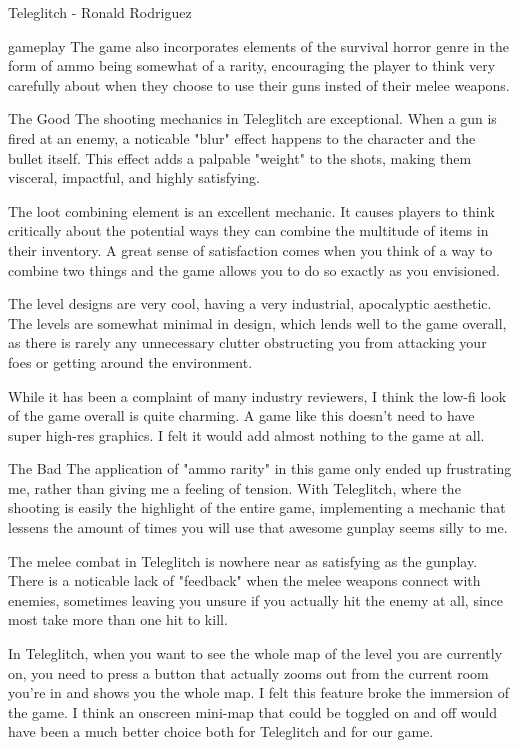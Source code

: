 \documentclass[12pt]{report}
\begin{document}
\begin{section}{Teleglitch - Ronald Rodriguez}
\begin{subsection}{gameplay}
The game also incorporates elements of the survival horror genre in the form of 
ammo being somewhat of a rarity, encouraging the player to think very carefully 
about when they choose to use their guns insted of their melee weapons.
\end{subsection}

\begin{subsection}{The Good}
The shooting mechanics in Teleglitch are exceptional. When a gun is fired at an 
enemy, a noticable "blur" effect happens to the character and the bullet itself. 
This effect adds a palpable "weight" to the shots, making them visceral, impactful, 
and highly satisfying. 

The loot combining element is an excellent mechanic. It causes players to think 
critically about the potential ways they can combine the multitude of items in their 
inventory. A great sense of satisfaction comes when you think of a way to combine 
two things and the game allows you to do so exactly as you envisioned. 

The level designs are very cool, having a very industrial, apocalyptic aesthetic. 
The levels are somewhat minimal in design, which lends well to the game overall, as 
there is rarely any unnecessary clutter obstructing you from attacking your foes or 
getting around the environment. 

While it has been a complaint of many industry reviewers, I think the low-fi look of 
the game overall is quite charming. A game like this doesn't need to have super high-res 
graphics. I felt it would add almost nothing to the game at all. 

\end{subsection}

\begin{subsection}{The Bad}
The application of "ammo rarity" in this game only ended up frustrating me, rather than 
giving me a feeling of tension. With Teleglitch, where the shooting is easily the highlight of 
the entire game, implementing a mechanic that lessens the amount of times you will use that 
awesome gunplay seems silly to me. 

The melee combat in Teleglitch is nowhere near as satisfying as the gunplay. There is a noticable 
lack of "feedback" when the melee weapons connect with enemies, sometimes leaving you unsure 
if you actually hit the enemy at all, since most take more than one hit to kill.  

In Teleglitch, when you want to see the whole map of the level you are currently on, you need 
to press a button that actually zooms out from the current room you're in and shows you the whole 
map. I felt this feature broke the immersion of the game. I think an onscreen mini-map that 
could be toggled on and off would have been a much better choice both for Teleglitch and for 
our game.

\end{subsection}

\end{section}
\end{document}
